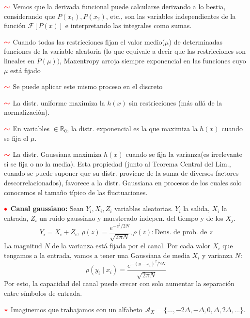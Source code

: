 \documentclass[%
 reprint,
 amsmath,amssymb,
 aps,
]{revtex4-1}
\begin{document}
\textbf{$\textcolor{red}{\color{red}{\boldsymbol{\sim}}}$}
Vemos que la derivada funcional puede calcularse derivando a lo bestia, considerando
que $P\left(x_{1}\right), P\left(x_{2}\right)$, etc., son las variables independientes de la función $\mathcal{F}[P(x)]$ e interpretando las
integrales como sumas.

\textbf{$\textcolor{red}{\color{red}{\boldsymbol{\sim}}}$}
Cuando todas las restricciones fijan el valor medio($\mu$) de determinadas funciones de la variable aleatoria (lo que equivale a decir que las restricciones son lineales en $P(\mu))$, Maxentropy arroja siempre exponencial en las funciones cuyo $\mu$ está fijado

\textbf{$\textcolor{red}{\color{red}{\boldsymbol{\sim}}}$} Se puede aplicar este mismo proceso en el discreto

\textbf{$\textcolor{red}{\color{red}{\boldsymbol{\sim}}}$} La distr. uniforme maximiza la $h(x)$ sin restricciones (más allá de la normalización).

\textbf{$\textcolor{red}{\color{red}{\boldsymbol{\sim}}}$} En variables $\in \mathbb{R}_0$, la distr. exponencial es la que maximiza la $h(x)$ cuando se fija el $\mu$.

\textbf{$\textcolor{red}{\color{red}{\boldsymbol{\sim}}}$} La distr. Gaussiana maximiza $h(x)$ cuando se fija la varianza(es irrelevante si se fija o no la media). Esta propiedad (junto al Teorema Central del Lim., cuando se puede suponer que su distr. proviene de la suma de diversos factores descorrelacionados), favorece a la distr. Gaussiana en procesos de los cuales solo conocemos el tamaño típico de las fluctuaciones.

\textbf{$\color{red}{\bullet}$ Canal gaussiano:} 
Sean $Y_{i}, X_{i}, Z_{i}$ variables aleatorias. $Y_{i}$ la salida, $X_{i}$ la entrada, $Z_{i}$ un ruido gaussiano y muestreado indepen. del tiempo y de los $X_j$.
$$
Y_{i}=X_{i}+Z_{i}
, \
\rho(z)=\frac{e^{-z^{2} / 2 N}}{\sqrt{2 \pi N}}, 
\rho(z): \text{Dens. de prob. de } z
$$
La magnitud $N$ de la varianza está fijada por el canal. Por cada valor $X_{i}$ que tengamos a la entrada, vamos a tener una Gaussiana de media $X_{i}$ y varianza $N$:
$$
\rho\left(y_{i} \mid x_{i}\right)=\frac{e^{-\left(y-x_{i}\right)^{2} / 2 N}}{\sqrt{2 \pi N}}
$$
Por esto, la capacidad del canal puede crecer con solo aumentar la separación entre símbolos de entrada. 

\textbf{$\textcolor{red}{\color{red}{\boldsymbol{*}}}$} Imaginemos que trabajamos con un alfabeto $\mathcal{A}_{X}=\{\ldots,-2 \Delta,-\Delta, 0, \Delta, 2 \Delta, \ldots\}$. 
\end{document}
